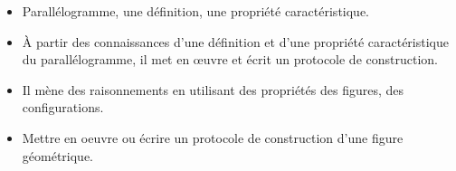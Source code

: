 \begin{prerequis}    
    \begin{itemize}
        \item[\emoji{red-heart}] Parallélogramme, une définition, une propriété caractéristique.
        \item[\emoji{diamond-suit}] À partir des connaissances d'une définition et d'une propriété caractéristique du parallélogramme, il met en \oe uvre et écrit un protocole de construction.
        \columnbreak
        \item[\emoji{diamond-suit}] Il mène des raisonnements en utilisant des propriétés des figures, des configurations.
        \item[\emoji{diamond-suit}] Mettre en oeuvre ou écrire un protocole de construction d’une figure géométrique.
    \end{itemize}
\end{prerequis}